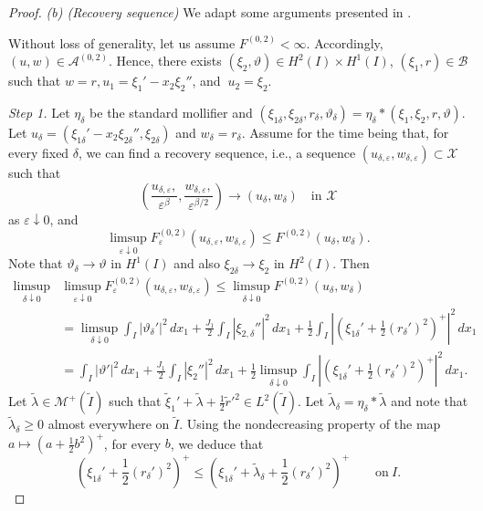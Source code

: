 \documentclass[a4, 11pt, reqno, final]{amsart}
\newcommand{\calA}{\mathcal{A}}
\newcommand{\calB}{\mathcal{B}}
\newcommand{\calM}{\mathcal{M}}
\newcommand{\calX}{\mathcal{X}}
\newcommand\e{\varepsilon}
\theoremstyle{plain}%
\begin{document}
\begin{proof}
		{\it {(b) (Recovery sequence)}} We adapt some arguments presented in \cite{Conti2005}.

		Without loss of generality, let us assume $F^{(0,2)} <\infty$. Accordingly, $(u,w) \in \calA^{(0,2)}$. Hence, there exists $(\xi_2, \vartheta) \in H^2(I) \times H^1(I)$, $(\xi_1, r) \in \calB$  such that $w = r, u_1 = \xi_1' - x_2\xi_2''$, and $\ u_2 = \xi_2$.

		\textit{Step 1.} Let $\eta_\delta$ be the standard mollifier and $(\xi_{1\delta}, \xi_{2\delta}, r_{\delta}, \vartheta_\delta) =\eta_\delta \ast (\xi_1, \xi_2, r, \vartheta) $. Let
		$u_\delta=( \xi_{1\delta}' - x_2\xi_{2\delta}'',\xi_{2\delta})$ and $w_\delta=r_\delta$.
		Assume for the time being that, for every fixed $\delta$, we can find a recovery sequence, i.e., a sequence $(u_{\delta,\e}, w_{\delta, \e}) \subset \calX$ such that
		$$
		(\frac{u_{\delta,\e},}{\e^\beta},\frac{w_{\delta,\e},}{\e^{\beta/2}})\to (u_\delta,w_\delta)\quad \mbox{in }\calX
		$$
		as $\e\downarrow 0$, and
		$$ \limsup_{\e\downarrow 0} F_{\e}^{(0,2)}(u_{\delta,\e}, w_{\delta, \e}) \leq F^{(0,2)}(u_{\delta}, w_{\delta}).$$
		Note that $\vartheta_\delta\to\vartheta$ in $H^1(I)$ and also $\xi_{2\delta}\to\xi_2$ in $H^2(I)$.	Then 		\begin{align}
			\limsup_{\delta\downarrow 0}&\limsup_{\e\downarrow 0} F_{\e}^{(0,2)}(u_{\delta,\e}, w_{\delta, \e}) \leq \limsup_{\delta\downarrow 0} F^{(0,2)}(u_{\delta}, w_{\delta})\nonumber\\
			&= \limsup_{\delta\downarrow 0} \int_I |\vartheta_\delta'|^2 \,dx_1 + \frac{J_1}{2}\int_I | \xi_{2,\delta}'' |^2 \,dx_1 + \frac12\int_I | (\xi_{1\delta}' + \frac12 (r_\delta')^2)^+ |^2 \,dx_1\nonumber\\
			&=  \int_I |\vartheta'|^2 \,dx_1 + \frac{J_1}{2}\int_I | \xi_{2}'' |^2 \,dx_1 + \frac12 \limsup_{\delta\downarrow 0}\int_I | (\xi_{1\delta}' + \frac12 (r_\delta')^2)^+ |^2 \,dx_1.\label{rt1}
		\end{align}
		Let $\widetilde{\lambda} \in \calM^+(\widetilde{I})$ such that $\widetilde{\xi}_1' + \widetilde{\lambda} + \frac12 \widetilde{r}'^2 \in L^2(\widetilde{I})$. Let $\widetilde{\lambda}_\delta=\eta_\delta\ast \widetilde{\lambda}$ and note that $\widetilde{\lambda}_\delta \ge 0$ almost everywhere on $\widetilde{I}$. Using
		the nondecreasing property of the map
		$a\mapsto (a + \frac12 b^2)^+$, for every $b$, we deduce that
		\begin{equation}\label{rt2}
			(\xi_{1\delta}' + \frac12 (r_\delta')^2)^+\le (\xi_{1\delta}' +\widetilde{\lambda}_\delta+ \frac12 (r_\delta')^2)^+ \qquad \text{on} \ I.
		\end{equation}


\end{proof}
\end{document}
